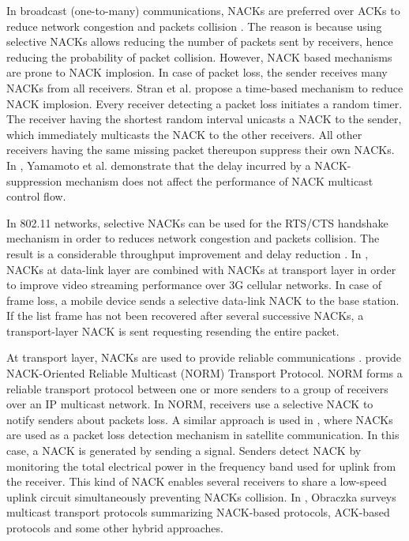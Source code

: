 \documentclass[conference]{IEEEtran}
\begin{document}
{In broadcast (one-to-many) communications, NACKs are preferred over ACKs to reduce network congestion and 
packets collision \cite{pingali1994comparison}. 
The reason is because using selective NACKs allows reducing the number of packets sent by receivers, hence 
reducing the probability of packet collision. However, NACK based mechanisms are prone to NACK implosion. 
In case of packet loss, the sender receives many NACKs from all receivers. Stran et al. \cite{satran2004nack} 
propose a time-based mechanism to reduce NACK implosion. Every receiver detecting a packet loss initiates a 
random timer. The receiver having the shortest random interval unicasts a NACK to the sender, which immediately 
multicasts the NACK to the other receivers. All other receivers having the same missing packet thereupon 
suppress their own NACKs. In \cite{yamamoto2000performance}, Yamamoto et al. demonstrate that the delay incurred 
by a NACK-suppression mechanism does not affect the performance of NACK multicast control flow.

In 802.11 networks, selective NACKs can be used for the RTS/CTS handshake mechanism in order to reduces network 
congestion and packets collision. The result is a considerable throughput improvement and delay reduction 
\cite{impett2000receiver,sabah2010use}. In \cite{liu2005client}, NACKs at data-link layer are combined with 
NACKs at transport layer in order to improve video streaming performance over 3G cellular networks. In case 
of frame loss, a mobile device sends a selective data-link NACK to the base station. If the list frame has not 
been recovered after several successive NACKs, a transport-layer NACK is sent requesting resending the entire 
packet.

At transport layer, NACKs are used to provide reliable communications \cite{adamson2009nack,adamson2008multicast,
ichihara2003reliable,obraczka1998multicast}. \cite{adamson2009nack,adamson2008multicast} provide NACK-Oriented 
Reliable Multicast (NORM) Transport Protocol. NORM forms a reliable transport protocol between one or more 
senders to a group of receivers over an IP multicast network. In NORM, receivers use a selective NACK to 
notify senders about packets loss. A similar approach is used in \cite{ichihara2003reliable}, where NACKs are 
used as a packet loss detection mechanism in satellite communication. In this case, a NACK is generated by 
sending a signal. Senders detect NACK by monitoring the total electrical power in the frequency band used for 
uplink from the receiver. This kind of NACK enables several receivers to share a low-speed uplink circuit 
simultaneously preventing NACKs collision. In \cite{obraczka1998multicast}, Obraczka surveys multicast transport 
protocols summarizing NACK-based protocols, ACK-based protocols and some other hybrid approaches.


}
\end{document}

